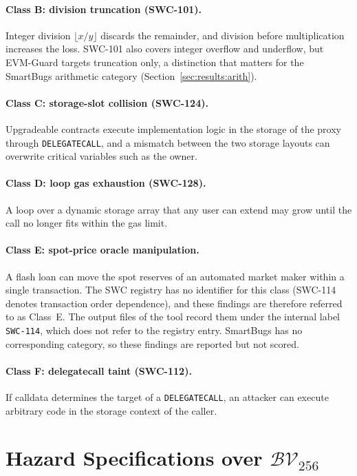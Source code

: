 \documentclass[pdflatex,sn-mathphys]{sn-jnl}
\theoremstyle{thmstyletwo}
\theoremstyle{thmstyletwo}
\begin{document}
\paragraph{Class B: division truncation (SWC-101).} Integer division $\lfloor x/y \rfloor$ discards the remainder, and division before multiplication increases the loss. SWC-101 also covers integer overflow and underflow, but EVM-Guard targets truncation only, a distinction that matters for the SmartBugs arithmetic category (Section~\ref{sec:results:arith}).

\paragraph{Class C: storage-slot collision (SWC-124).} Upgradeable contracts execute implementation logic in the storage of the proxy through \texttt{DELEGATECALL}, and a mismatch between the two storage layouts can overwrite critical variables such as the owner.

\paragraph{Class D: loop gas exhaustion (SWC-128).} A loop over a dynamic storage array that any user can extend may grow until the call no longer fits within the gas limit.

\paragraph{Class E: spot-price oracle manipulation.} A flash loan can move the spot reserves of an automated market maker within a single transaction. The SWC registry has no identifier for this class (SWC-114 denotes transaction order dependence), and these findings are therefore referred to as Class~E. The output files of the tool record them under the internal label \texttt{SWC-114}, which does not refer to the registry entry. SmartBugs has no corresponding category, so these findings are reported but not scored.

\paragraph{Class F: delegatecall taint (SWC-112).} If calldata determines the target of a \texttt{DELEGATECALL}, an attacker can execute arbitrary code in the storage context of the caller.

\section{Hazard Specifications over \texorpdfstring{$\mathcal{BV}_{256}$}{BV256}}\label{sec:formal_framework}
\end{document}
